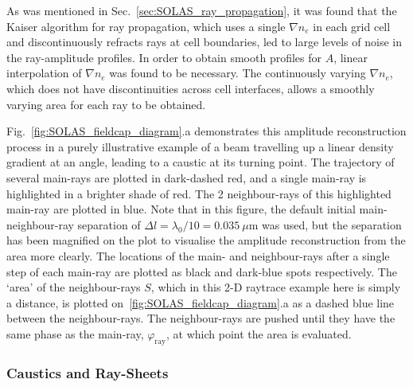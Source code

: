As was mentioned in Sec.~\ref{sec:SOLAS_ray_propagation}, it was found that the Kaiser algorithm for ray propagation, which uses a single $\nabla n_e$ in each grid cell and discontinuously refracts rays at cell boundaries, led to large levels of noise in the ray-amplitude profiles.
In order to obtain smooth profiles for $A$, linear interpolation of $\nabla n_e$ was found to be necessary.
The continuously varying $\nabla n_e$, which does not have discontinuities across cell interfaces, allows a smoothly varying area for each ray to be obtained.

Fig.~\ref{fig:SOLAS_fieldcap_diagram}.a demonstrates this amplitude reconstruction process in a purely illustrative example of a beam travelling up a linear density gradient at an angle, leading to a caustic at its turning point.
The trajectory of several main-rays are plotted in dark-dashed red, and a single main-ray is highlighted in a brighter shade of red.
The 2 neighbour-rays of this highlighted main-ray are plotted in blue.
Note that in this figure, the default initial main-neighbour-ray separation of $\Delta l=\lambda_0/10=0.035\ \mu\text{m}$ was used, but the separation has been magnified on the plot to visualise the amplitude reconstruction from the area more clearly.
The locations of the main- and neighbour-rays after a single step of each main-ray are plotted as black and dark-blue spots respectively.
The `area' of the neighbour-rays $S$, which in this 2-D raytrace example here is simply a distance, is plotted on~\ref{fig:SOLAS_fieldcap_diagram}.a as a dashed blue line between the neighbour-rays.
The neighbour-rays are pushed until they have the same phase as the main-ray, $\varphi_{\text{ray}}$, at which point the area is evaluated.

\subsubsection{Caustics and Ray-Sheets}%
\label{sec:SOLAS_caustics}

